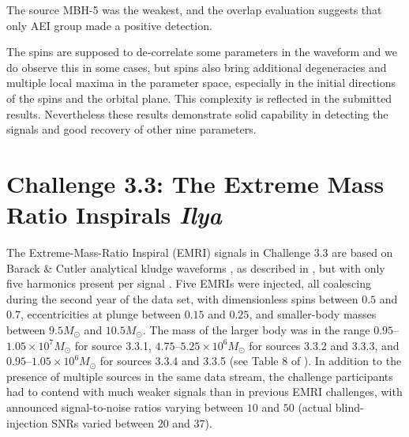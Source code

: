 \documentclass{iopart}
\begin{document}
The source MBH-5 was the weakest, and the overlap evaluation suggests that only AEI group made a positive detection. 

The spins are supposed to de-correlate some parameters in the waveform \cite{SpinBBHLangHugues} and we 
do observe this in some cases, but 
spins also bring additional degeneracies and multiple local maxima in the parameter space, especially in the 
initial directions of the spins and the orbital plane. This complexity is reflected in the submitted results.
Nevertheless these results demonstrate solid capability in detecting the signals and good recovery of other 
nine parameters. 




\section{Challenge 3.3: The Extreme Mass Ratio Inspirals {\it Ilya}}

The Extreme-Mass-Ratio Inspiral (EMRI) signals in Challenge 3.3 are based on Barack \& Cutler analytical kludge waveforms \cite{barackcutler}, as described in \cite{mldcgwdaw2}, but with only five harmonics present per signal \cite{MLDC3}.  Five EMRIs were injected, all coalescing during the second year of the data set, with dimensionless spins between $0.5$ and $0.7$, eccentricities at plunge between $0.15$ and $0.25$, and smaller-body masses between $9.5 M_\odot$ and $10.5 M_\odot$.  The mass of the larger body was in the range $0.95$--$1.05\times10^7 M_\odot$ for source 3.3.1,  $4.75$--$5.25 \times10^6 M_\odot$ for sources 3.3.2 and 3.3.3, and $0.95$--$1.05\times10^6 M_\odot$ for sources 3.3.4 and 3.3.5 (see Table 8 of \cite{MLDC3}).  In addition to the presence of multiple sources in the same data stream, the challenge participants had to contend with much weaker signals than in previous EMRI challenges, with announced signal-to-noise ratios varying between $10$ and $50$ (actual blind-injection SNRs varied between $20$ and $37$).
\end{document}
